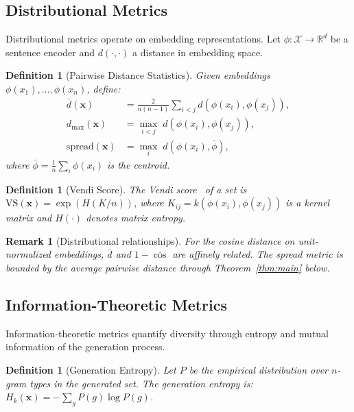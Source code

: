 \documentclass[11pt,a4paper]{article}
\newtheorem{definition}[theorem]{Definition}
\newtheorem{remark}[theorem]{Remark}
\newcommand{\R}{\mathbb{R}}
\begin{document}
\subsection{Distributional Metrics}

Distributional metrics operate on embedding representations.
Let $\phi: \mathcal{X} \to \R^d$ be a sentence encoder and
$d(\cdot, \cdot)$ a distance in embedding space.

\begin{definition}[Pairwise Distance Statistics]
Given embeddings $\phi(x_1), \ldots, \phi(x_n)$, define:
\begin{align}
  \bar{d}(\mathbf{x}) &= \frac{2}{n(n-1)}
    \sum_{i < j} d(\phi(x_i), \phi(x_j)), \label{eq:avg_pw} \\
  d_{\max}(\mathbf{x}) &= \max_{i < j}\;
    d(\phi(x_i), \phi(x_j)), \label{eq:max_pw} \\
  \mathrm{spread}(\mathbf{x}) &= \max_i\;
    d(\phi(x_i), \bar{\phi}), \label{eq:spread}
\end{align}
where $\bar{\phi} = \frac{1}{n}\sum_i \phi(x_i)$ is the centroid.
\end{definition}

\begin{definition}[Vendi Score]
The Vendi score~\citep{friedman2023vendi} of a set is
$\mathrm{VS}(\mathbf{x}) = \exp(H(K/n))$, where
$K_{ij} = k(\phi(x_i), \phi(x_j))$ is a kernel matrix
and $H(\cdot)$ denotes matrix entropy.
\end{definition}

\begin{remark}[Distributional relationships]
For the cosine distance on unit-normalized embeddings,
$\bar{d}$ and $1 - \overline{\cos}$ are affinely related.
The spread metric is bounded by the average pairwise distance
through Theorem~\ref{thm:main} below.
\end{remark}

\subsection{Information-Theoretic Metrics}

Information-theoretic metrics quantify diversity through
entropy and mutual information of the generation process.

\begin{definition}[Generation Entropy]
Let $P$ be the empirical distribution over $n$-gram types
in the generated set.  The generation entropy is:
$H_k(\mathbf{x}) = -\sum_{g} P(g) \log P(g)$.
\end{definition}
\end{document}
